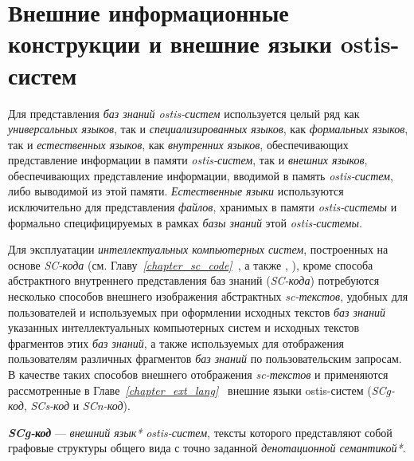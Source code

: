 \section{Внешние информационные конструкции и внешние языки ostis-систем}
\label{sec_external_information_constructs_external_lang}

Для представления \textit{баз знаний ostis-систем} используется целый ряд как \textit{универсальных языков}, так и \textit{специализированных языков}, как \textit{формальных языков}, так и \textit{естественных языков}, как \textit{внутренних языков}, обеспечивающих представление информации в памяти \textit{ostis-систем}, так и \textit{внешних языков}, обеспечивающих представление информации, вводимой в память \textit{ostis-систем}, либо выводимой из этой памяти. \textit{Естественные языки} используются исключительно для представления \textit{файлов}, хранимых в памяти \textit{ostis-системы} и формально специфицируемых в рамках \textit{базы знаний} этой \textit{ostis-системы}.

Для эксплуатации \textit{интеллектуальных компьютерных систем}, построенных на основе \textit{SC-кода} (см. Главу~\textit{\ref{chapter_sc_code}~}, а также , ), кроме способа абстрактного внутреннего представления баз знаний (\textit{SC-кода}) потребуются несколько способов внешнего изображения абстрактных \textit{sc-текстов}, удобных для пользователей и используемых при оформлении исходных текстов \textit{баз знаний} указанных интеллектуальных компьютерных систем и исходных текстов фрагментов этих \textit{баз знаний}, а также используемых для отображения пользователям различных фрагментов \textit{баз знаний} по пользовательским запросам.
В качестве таких способов внешнего отображения \textit{sc-текстов} и применяются рассмотренные в Главе~\textit{\ref{chapter_ext_lang}~} внешние языки ostis-систем (\textit{SCg-код}, \textit{SCs-код} и \textit{SCn-код}).

\textbf{\textit{SCg-код}} --- \textit{внешний язык*} \textit{ostis-систем}, тексты которого представляют собой графовые структуры общего вида с точно заданной \textit{денотационной семантикой*}.

\begin{SCn}

    \begin{scnindent}
    \end{scnindent}

\end{SCn}

